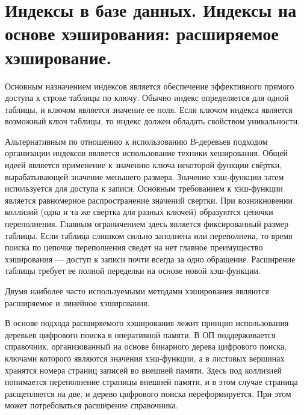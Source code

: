 \documentclass[a4paper,12pt]{article}
\begin{document}
\section{Индексы в базе данных. Индексы на основе хэширования: расширяемое хэширование.}
Основным назначением индексов является обеспечение эффективного прямого доступа к
строке таблицы по ключу. Обычно индекс определяется для одной таблицы, и ключом
является значение ее поля. Если ключом индекса является возможный ключ таблицы, то
индекс должен обладать свойством уникальности.

Альтернативным по отношению к использованию B-деревьев подходом организации
индексов является использование техники хеширования. Общей идеей является применение
к значению ключа некоторой функции свёртки, вырабатывающей значение меньшего
размера. Значение хэш-функции затем используется для доступа к записи. Основным
требованием к хэш-функции является равномерное распространение значений свертки. При
возникновении коллизий (одна и та же свертка для разных ключей) образуются цепочки
переполнения. Главным ограничением здесь является фиксированный размер таблицы. Если
таблица слишком сильно заполнена или переполнена, то время поиска по цепочке
переполнения сведет на нет главное преимущество хэширования — доступ к записи почти
всегда за одно обращение. Расширение таблицы требует ее полной переделки на основе новой
хэш-функции.

Двумя наиболее часто используемыми методами хэширования являются расширяемое и
линейное хэширования.

В основе подхода расширяемого хэширования лежит принцип использования деревьев
цифрового поиска в оперативной памяти. В ОП поддерживается справочник, организованный
на основе бинарного дерева цифрового поиска, ключами которого являются значения хэш-функции,
а в листовых вершинах хранятся номера страниц записей во внешней памяти. Здесь
под коллизией понимается переполнение страницы внешней памяти, и в этом случае
страница расщепляется на две, и дерево цифрового поиска переформируется. При этом
может потребоваться расширение справочника.
\end{document}
